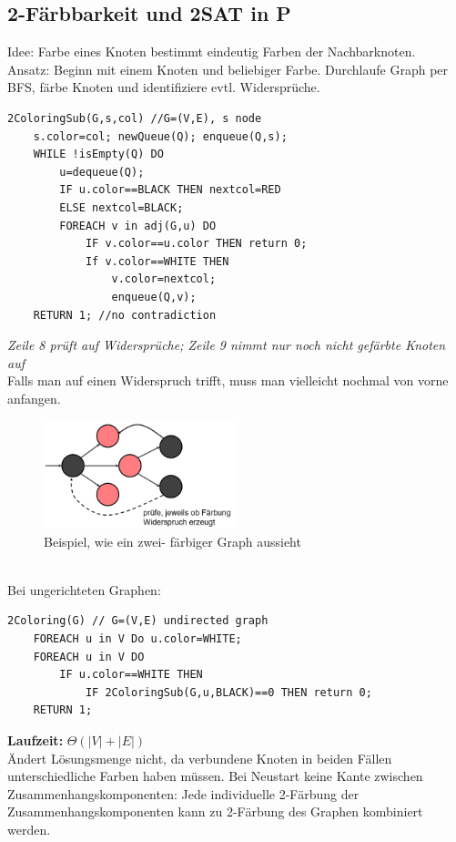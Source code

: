 \documentclass{article}
\begin{document}
        \subsection{2-Färbbarkeit und 2SAT in P}
            Idee: Farbe eines Knoten bestimmt eindeutig Farben der Nachbarknoten. \\
            Ansatz: Beginn mit einem Knoten und beliebiger Farbe. Durchlaufe Graph per BFS, färbe Knoten und identifiziere evtl. Widersprüche.\\
            \begin{lstlisting}[style=pseudocode]
2ColoringSub(G,s,col) //G=(V,E), s node
    s.color=col; newQueue(Q); enqueue(Q,s);
    WHILE !isEmpty(Q) DO
        u=dequeue(Q);
        IF u.color==BLACK THEN nextcol=RED
        ELSE nextcol=BLACK;
        FOREACH v in adj(G,u) DO
            IF v.color==u.color THEN return 0;
            If v.color==WHITE THEN
                v.color=nextcol;
                enqueue(Q,v);
    RETURN 1; //no contradiction
            \end{lstlisting}
            \textit{Zeile 8 prüft auf Widersprüche; Zeile 9 nimmt nur noch nicht gefärbte Knoten auf}\\
            Falls man auf einen Widerspruch trifft, muss man vielleicht nochmal von vorne anfangen.
            \begin{figure}[ht]
                \centering
                \includegraphics[width=0.5\textwidth]{Bilder/2Faerbbar.png}
                \caption{Beispiel, wie ein zwei- färbiger Graph aussieht}
                \label{fig:2Faerbbar}
            \end{figure}\\
            Bei ungerichteten Graphen:\\
            \begin{lstlisting}[style=pseudocode]
2Coloring(G) // G=(V,E) undirected graph
    FOREACH u in V Do u.color=WHITE;
    FOREACH u in V DO
        IF u.color==WHITE THEN
            IF 2ColoringSub(G,u,BLACK)==0 THEN return 0;
    RETURN 1;
            \end{lstlisting}
            \textbf{Laufzeit:} $\Theta (|V|+|E|)$\\
            Ändert Lösungsmenge nicht, da verbundene Knoten in beiden Fällen unterschiedliche Farben haben müssen. Bei Neustart keine Kante zwischen Zusammenhangskomponenten: Jede individuelle 2-Färbung der Zusammenhangskomponenten kann zu 2-Färbung des Graphen kombiniert werden.\\
\end{document}
